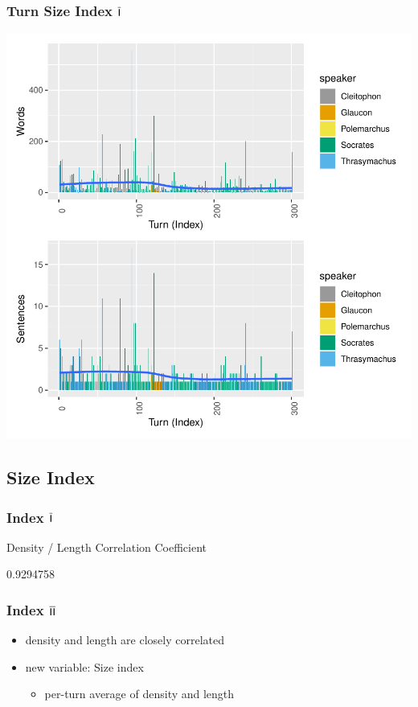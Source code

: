 \documentclass{beamer}
\renewcommand{\Roman}[1]{$\overline{\textsf{\small{\MakeUppercase{\romannumeral #1}}}}$}
\begin{document}
\begin{frame}[fragile]
\frametitle{Turn Size Index \Roman{1}}
\includegraphics{GreatSlideshow-Turn_Length}
\end{frame}



\subsection{Size Index}  %



\begin{frame}[fragile]
\frametitle{Index \Roman{1}}
\begin{block}{Density / Length Correlation Coefficient}
\begin{Schunk}
\begin{Soutput}
[1] 0.9294758
\end{Soutput}
\end{Schunk}
\end{block}
\end{frame}



\begin{frame}
\frametitle{Index \Roman{2}}
\begin{itemize}
\item density and length are closely correlated
\item new variable: Size index
  \begin{itemize}
  \item per-turn average of density and length
  \end{itemize}
\end{itemize}
\end{frame}
\end{document}
